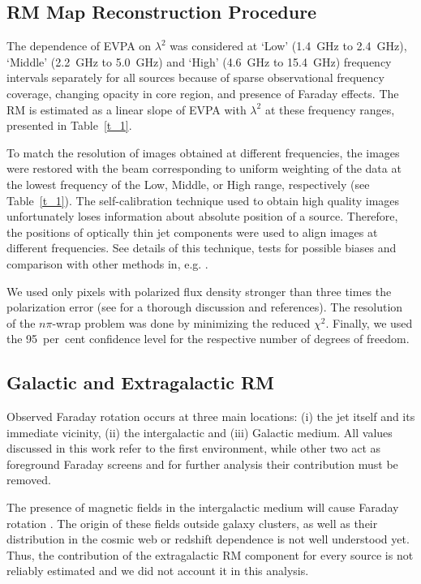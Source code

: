 \documentclass[a4paper,fleqn,usenatbib,useAMS]{mnras}
\begin{document}
\subsection{RM Map Reconstruction Procedure}
\label{s:rm_reconstr}

The dependence of EVPA on $\lambda^{2}$ was considered at `Low' (1.4~GHz to 2.4~GHz), `Middle' (2.2~GHz to 5.0~GHz) and `High' (4.6~GHz to 15.4~GHz) frequency intervals separately for all sources because of sparse observational frequency coverage, changing opacity in core region, and presence of Faraday effects. 
The RM is estimated as a linear slope of EVPA with $\lambda^2$ at these frequency ranges, presented in Table~\ref{t_1}.

To match the resolution of images obtained at different frequencies, the images were restored with the beam corresponding to uniform weighting of the data at the lowest frequency of the Low, Middle, or High range, respectively (see Table~\ref{t_1}).
The self-calibration technique used to obtain high quality images unfortunately loses information about absolute position of a source. 
Therefore, the positions of optically thin jet components were used to align images at different frequencies. See details of this technique, tests for possible biases and comparison with other methods in, e.g. \citet{kovalev_etal08,pushkarev_etal12,kutkin_etal14,2014MNRAS.441.1899F}. 

We used only pixels with polarized flux density stronger than three times the polarization error (see \citealt{taylor_zavala_10} for a thorough discussion and references). 
The resolution of the $n\pi$-wrap problem was done by minimizing the reduced $\chi^2$. Finally, we used the 95~per~cent confidence level for the respective number of degrees of freedom. 


\subsection{Galactic and Extragalactic RM}
\label{s:gal_rm}
Observed Faraday rotation occurs at three main locations: (i) the jet itself and its immediate vicinity, (ii) the intergalactic and (iii) Galactic medium. 
All values discussed in this work refer to the first environment, while other two act as foreground Faraday screens and for further analysis their contribution must be removed.

The presence of magnetic fields in the intergalactic medium will cause Faraday rotation \citep[see ][]{akahori_ryu_10,akahori_ryu_11,bernet_etal12}. 
The origin of these fields outside galaxy clusters, as well as their distribution in the cosmic web or redshift dependence is not well understood yet. 
Thus, the contribution of the extragalactic RM component for every source is not reliably estimated and we did not account it in this analysis.
\end{document}
